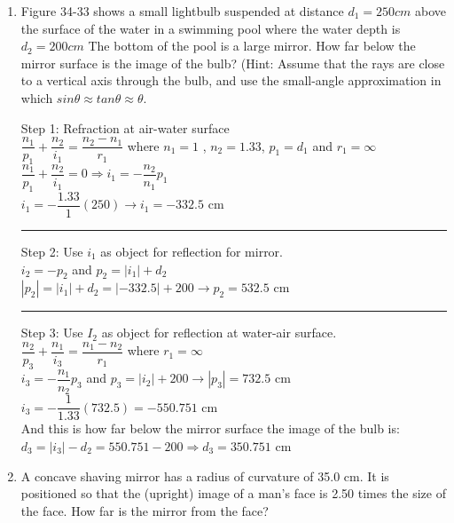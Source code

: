 \documentclass[fleqn]{article}
\begin{document}
  \begin{enumerate}
    \item Figure 34-33 shows a small lightbulb suspended at distance $d_1=250 cm$ above the surface of the water in a swimming pool where the water depth is $d_2=200 cm$ The bottom of the pool is a large mirror. How far below the mirror surface is the image of the bulb? (Hint: Assume that the rays are close to a vertical axis through the bulb, and use the small-angle approximation in which $sin\theta \approx tan \theta \approx \theta $.

    \textcolor{hwColor}{
      Step 1: Refraction at air-water surface \\
      $\dfrac{n_1}{p_1}+\dfrac{n_2}{i_1}=\dfrac{n_2-n_1}{r_1}$ where $n_1=1$ , $n_2=1.33$, $p_1=d_1$ and $r_1=\infty$ \\
      $\dfrac{n_1}{p_1}+\dfrac{n_2}{i_1}=0 \Longrightarrow i_1=-\dfrac{n_2}{n_1}p_1$ \\
      $i_1=-\dfrac{1.33}{1}(250) \rightarrow i_1=-332.5$ cm \\
    }

    \textcolor{hwColor}{
      \rule{15cm}{0.4pt}
    }

    \textcolor{hwColor}{
      Step 2: Use $i_1$ as object for reflection for mirror. \\
      $i_2=-p_2$ and $p_2=|i_1|+d_2$ \\
      $|p_2|=|i_1|+d_2=|-332.5|+200 \rightarrow p_2=532.5$ cm \\
    }

    \textcolor{hwColor}{
      \rule{15cm}{0.4pt}
    }

    \textcolor{hwColor}{
      Step 3: Use $I_2$ as object for reflection at water-air surface. \\
      $\dfrac{n_2}{p_3}+\dfrac{n_1}{i_3}=\dfrac{n_1-n_2}{r_1}$ where $r_1=\infty$ \\
      $i_3=-\dfrac{n_1}{n_2}p_3$ and $p_3=|i_2|+200 \rightarrow |p_3|=732.5$ cm \\
      $i_3=-\dfrac{1}{1.33}(732.5)=−550.751$ cm \\
      \bigbreak
      And this is how far below the mirror surface the image of the bulb is: \\
      $d_3=|i_3|-d_2=550.751-200 \Longrightarrow d_3=350.751$ cm
    }

    \item A concave shaving mirror has a radius of curvature of 35.0 cm. It is positioned so that the (upright) image of a man’s face is 2.50 times the size of the face. How far is the mirror from the face?


\end{enumerate}
\end{document}
